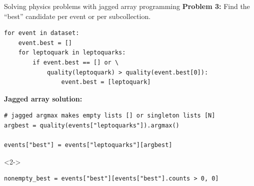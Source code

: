 \documentclass[aspectratio=169]{beamer}
\begin{document}
\begin{frame}[fragile]{Solving physics problems with jagged array programming}
\vspace{0.5 cm}
{\bf Problem 3:} Find the ``best'' candidate per event or per subcollection.
\small
\begin{verbatim}
for event in dataset:
    event.best = []
    for leptoquark in leptoquarks:
        if event.best == [] or \
            quality(leptoquark) > quality(event.best[0]):
                event.best = [leptoquark]
\end{verbatim}
\normalsize

\vspace{0.5 cm}
{\bf Jagged array solution:} 
\small
\begin{verbatim}
# jagged argmax makes empty lists [] or singleton lists [N]
argbest = quality(events["leptoquarks"]).argmax()

events["best"] = events["leptoquarks"][argbest]
\end{verbatim}

\vspace{0.05 cm}
\begin{uncoverenv}<2->
\begin{verbatim}
nonempty_best = events["best"][events["best"].counts > 0, 0]
\end{verbatim}
\end{uncoverenv}
\end{frame}
\end{document}
